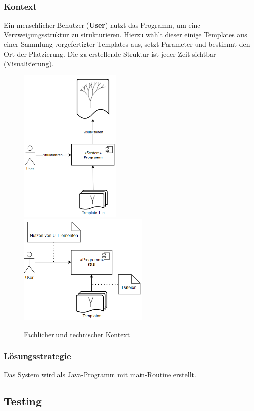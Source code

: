 \documentclass[11pt]{article}
\begin{document}
    \subsubsection{Kontext}
    Ein menschlicher Benutzer (\textbf{User}) nutzt das Programm, um eine Verzweigungsstruktur zu strukturieren.
    Hierzu wählt dieser einige Templates aus einer Sammlung vorgefertigter Templates aus, setzt Parameter und
    bestimmt den Ort der Platzierung.
    Die zu erstellende Struktur ist jeder Zeit sichtbar (Visualisierung).
    \begin{figure}[H]
        \centering
        \includegraphics[width=5cm]{../images/Release_1_fachlicher_Kontext.PNG}
        \hspace{1cm}
        \includegraphics[width=6.4cm]{../images/Release_1_technischer_Kontext.PNG}
        \caption{Fachlicher und technischer Kontext}
    \end{figure}

    \subsubsection{Lösungsstrategie}
    Das System wird als Java-Programm mit main-Routine erstellt.

    \subsection{Testing}
\end{document}
